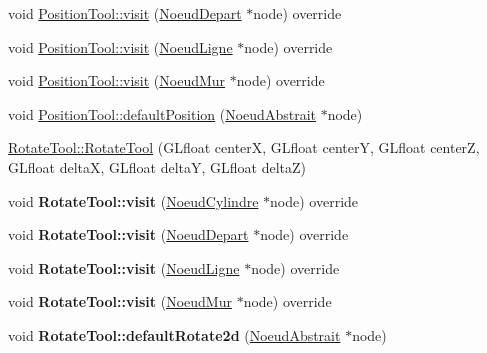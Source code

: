 \begin{DoxyCompactItemize}
\item 
void \hyperlink{group__inf2990_ga25f3c9e1decf3bf95d1e7491a2668565}{Position\+Tool\+::visit} (\hyperlink{class_noeud_depart}{Noeud\+Depart} $\ast$node) override
\item 
void \hyperlink{group__inf2990_ga7e8b178e97fab62523150d08d3195aef}{Position\+Tool\+::visit} (\hyperlink{class_noeud_ligne}{Noeud\+Ligne} $\ast$node) override
\item 
void \hyperlink{group__inf2990_gaf80e360d0e162b7075f5272e5860f60f}{Position\+Tool\+::visit} (\hyperlink{class_noeud_mur}{Noeud\+Mur} $\ast$node) override
\item 
void \hyperlink{group__inf2990_ga805981677e352dd98b018d04376bb6eb}{Position\+Tool\+::default\+Position} (\hyperlink{class_noeud_abstrait}{Noeud\+Abstrait} $\ast$node)
\item 
\hyperlink{group__inf2990_ga53087375f63f0e400fdd0bf569e90ad0}{Rotate\+Tool\+::\+Rotate\+Tool} (G\+Lfloat center\+X, G\+Lfloat center\+Y, G\+Lfloat center\+Z, G\+Lfloat delta\+X, G\+Lfloat delta\+Y, G\+Lfloat delta\+Z)
\item 
\hypertarget{group__inf2990_ga4142a7bdd90761c6dbda240a3fe62b5d}{}void {\bfseries Rotate\+Tool\+::visit} (\hyperlink{class_noeud_cylindre}{Noeud\+Cylindre} $\ast$node) override\label{group__inf2990_ga4142a7bdd90761c6dbda240a3fe62b5d}

\item 
\hypertarget{group__inf2990_ga9649bf652069731e900bb850bd3f8475}{}void {\bfseries Rotate\+Tool\+::visit} (\hyperlink{class_noeud_depart}{Noeud\+Depart} $\ast$node) override\label{group__inf2990_ga9649bf652069731e900bb850bd3f8475}

\item 
\hypertarget{group__inf2990_gaf071f2f4b15f734f64eb917fa29f2be7}{}void {\bfseries Rotate\+Tool\+::visit} (\hyperlink{class_noeud_ligne}{Noeud\+Ligne} $\ast$node) override\label{group__inf2990_gaf071f2f4b15f734f64eb917fa29f2be7}

\item 
\hypertarget{group__inf2990_gaa3542aa6a6a3f763a133b4003d30c41f}{}void {\bfseries Rotate\+Tool\+::visit} (\hyperlink{class_noeud_mur}{Noeud\+Mur} $\ast$node) override\label{group__inf2990_gaa3542aa6a6a3f763a133b4003d30c41f}

\item 
\hypertarget{group__inf2990_ga3d7a6452fd82b9684e5e24ed3aeef6b5}{}void {\bfseries Rotate\+Tool\+::default\+Rotate2d} (\hyperlink{class_noeud_abstrait}{Noeud\+Abstrait} $\ast$node)\label{group__inf2990_ga3d7a6452fd82b9684e5e24ed3aeef6b5}


\end{DoxyCompactItemize}
